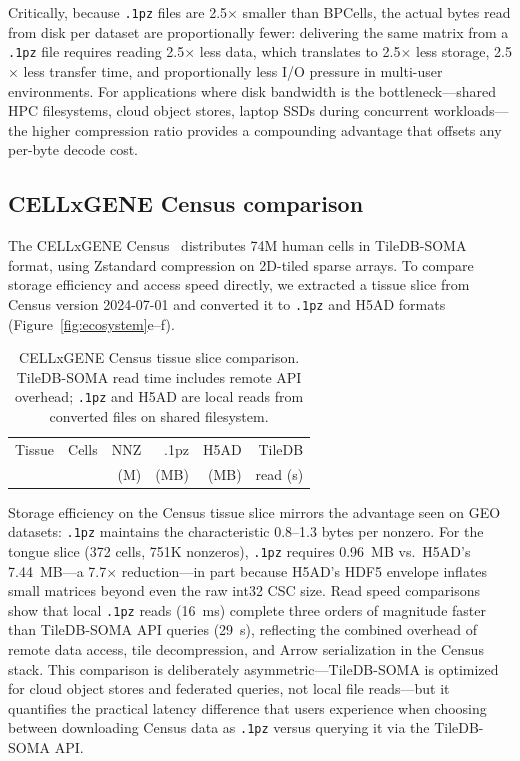 \documentclass[10pt,twocolumn,letterpaper]{article}
\begin{document}
Critically, because \texttt{.1pz} files are 2.5$\times$ smaller than BPCells, the actual bytes read from disk per dataset are proportionally fewer: delivering the same matrix from a \texttt{.1pz} file requires reading 2.5$\times$ less data, which translates to 2.5$\times$ less storage, 2.5$\times$ less transfer time, and proportionally less I/O pressure in multi-user environments.
For applications where disk bandwidth is the bottleneck---shared HPC filesystems, cloud object stores, laptop SSDs during concurrent workloads---the higher compression ratio provides a compounding advantage that offsets any per-byte decode cost.

\subsection{CELLxGENE Census comparison}

The CELLxGENE Census~\cite{chanzuckerberg2021cellxgene} distributes 74M human cells in TileDB-SOMA format, using Zstandard compression on 2D-tiled sparse arrays.
To compare storage efficiency and access speed directly, we extracted a tissue slice from Census version 2024-07-01 and converted it to \texttt{.1pz} and H5AD formats (Figure~\ref{fig:ecosystem}e--f).

\begin{table}[t]
\centering
\caption{CELLxGENE Census tissue slice comparison. TileDB-SOMA read time includes remote API overhead; \texttt{.1pz} and H5AD are local reads from converted files on shared filesystem.}
\label{tab:census}
\footnotesize
\begin{tabular}{l r r r r r}
\toprule
Tissue & Cells & NNZ & .1pz & H5AD & TileDB \\
 & & (M) & (MB) & (MB) & read (s) \\
\midrule

\bottomrule
\end{tabular}
\end{table}

Storage efficiency on the Census tissue slice mirrors the advantage seen on GEO datasets: \texttt{.1pz} maintains the characteristic 0.8--1.3 bytes per nonzero.
For the tongue slice (372 cells, 751K nonzeros), \texttt{.1pz} requires 0.96~MB vs.\ H5AD's 7.44~MB---a 7.7$\times$ reduction---in part because H5AD's HDF5 envelope inflates small matrices beyond even the raw int32 CSC size.
Read speed comparisons show that local \texttt{.1pz} reads (16~ms) complete three orders of magnitude faster than TileDB-SOMA API queries (29~s), reflecting the combined overhead of remote data access, tile decompression, and Arrow serialization in the Census stack.
This comparison is deliberately asymmetric---TileDB-SOMA is optimized for cloud object stores and federated queries, not local file reads---but it quantifies the practical latency difference that users experience when choosing between downloading Census data as \texttt{.1pz} versus querying it via the TileDB-SOMA API.
\end{document}
